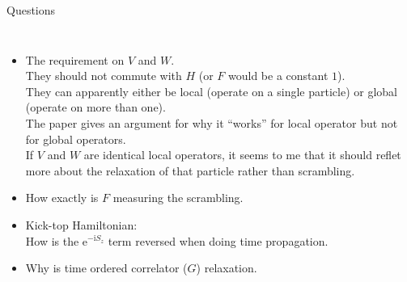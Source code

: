 \documentclass[xcolor={table}]{beamer}
\newcommand{\ue}{\mathrm{e}}
\newcommand{\ui}{\mathrm{i}}
\begin{document}
\begin{frame}{Questions}
  \begin{center}
    \begin{columns}
      \column{10cm}
      \begin{itemize}
      \item The requirement on $V$ and $W$.\\
        They should not commute with $H$ (or $F$ would be a constant $1$).\\
        They can apparently either be local (operate on a single particle)
        or global (operate on more than one).\\
        The paper gives an argument for why it ``works'' for local operator
        but not for global operators.\\
        If $V$ and $W$ are identical local operators,
        it seems to me that it should reflet more about the relaxation of that particle
        rather than scrambling.
      \item How exactly is $F$ measuring the scrambling.
      \item Kick-top Hamiltonian:\\
        How is the $\ue^{-\ui S_z}$ term reversed when doing time propagation.
      \item Why is time ordered correlator ($G$) relaxation.
      \end{itemize}
    \end{columns}
  \end{center}
\end{frame}
\end{document}
